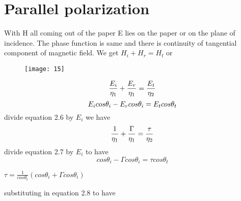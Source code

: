 \section{Parallel polarization}
With H all coming out of the paper E lies on the paper or on the plane of incidence. The phase function is same and there is continuity  of tangential component of magnetic  field.
We get $H_{i} + H_{r} = H_{t}$ or\\
\begin{figure}[h]
	\centering
	\texttt{[image: 15]}
	\caption{}
\end{figure}
\begin{equation}
\centering
\frac{E_{i}}{\eta_{1}} + \frac{E_{r}}{\eta_{1}} = \frac{E_{t}}{\eta_{2}}
\end{equation}
\begin{equation}
\centering
E_{i} cos\theta_{i} - E_{r} cos\theta_{i} = E_{t} cos\theta_{t}
\end{equation}
divide equation 2.6 by $E_{i}$ we have
\begin{equation}
\centering
\frac{1}{\eta_{1}} + \frac{\Gamma}{\eta_{1}} = \frac{\tau}{\eta_{2}}
\end{equation}
divide equation 2.7 by $E_{i}$ to have
\begin{equation}
cos\theta_{i} - \Gamma cos\theta_{i} = \tau cos\theta_{t}
\end{equation}
\begin{center}
$\tau = \frac{1}{cos\theta_{t}} (cos\theta_{i} + \Gamma cos\theta_{i})$
\end{center}
substituting in equation 2.8 to have
